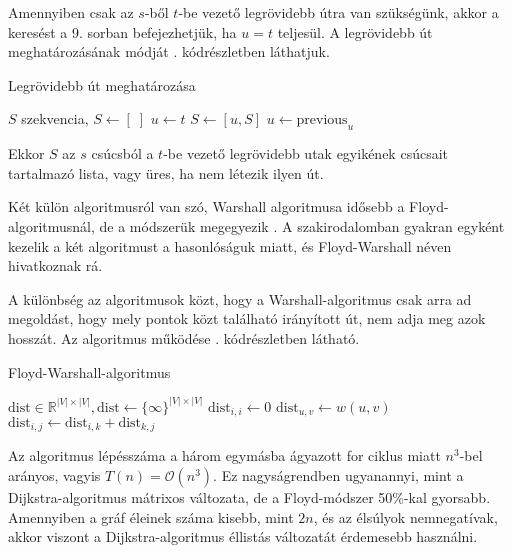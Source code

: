 Amennyiben csak az $s$-ből $t$-be vezető legrövidebb útra van szükségünk, akkor a keresést a 9. sorban befejezhetjük, ha $u = t$ teljesül. A legrövidebb út meghatározásának módját . kódrészletben láthatjuk.

\begin{algorithm}
\caption{Legrövidebb út meghatározása}
\begin{algorithmic}[1]
\STATE $S$ szekvencia, $S \gets [\;]$
\STATE $u \gets t$
    \STATE $S \gets [u, S]$
    \STATE $u \gets \text{previous}_u$
\ENDWHILE
\end{algorithmic}
\label{algo:legrovidebb}
\end{algorithm}

Ekkor $S$ az $s$ csúcsból a $t$-be vezető legrövidebb utak egyikének csúcsait tartalmazó lista, vagy üres, ha nem létezik ilyen út.

\newpage


Két külön algoritmusról van szó, Warshall algoritmusa idősebb a Floyd-algoritmusnál, de a módszerük megegyezik \cite{floyd-warshall}. A szakirodalomban gyakran egyként kezelik a két algoritmust a hasonlóságuk miatt, és Floyd-Warshall néven hivatkoznak rá.

A különbség az algoritmusok közt, hogy a Warshall-algoritmus csak arra ad megoldást, hogy mely pontok közt található irányított út, nem adja meg azok hosszát. Az algoritmus működése . kódrészletben látható.

\begin{algorithm}
\caption{Floyd-Warshall-algoritmus}
\begin{algorithmic}[1]
\STATE $\text{dist} \in \mathbb{R}^{|V| \times |V|}, \text{dist} \gets \{\infty\}^{|V| \times |V|}$
    \STATE $\text{dist}_{i, i} \gets 0$
\ENDFOR
{}
    \STATE $\text{dist}_{u, v} \gets w(u, v)$
\ENDFOR
{}
                \STATE $\text{dist}_{i, j} \gets \text{dist}_{i, k} + \text{dist}_{k, j}$
            \ENDIF
        \ENDFOR
    \ENDFOR
\ENDFOR
\end{algorithmic}
\label{algo:floyd-warshall}
\end{algorithm}

Az algoritmus lépésszáma a három egymásba ágyazott for ciklus miatt $n^3$-bel arányos, vagyis $T(n) = \mathcal{O}(n^3)$. Ez nagyságrendben ugyanannyi, mint a Dijkstra-algoritmus mátrixos változata, de a Floyd-módszer 50\%-kal gyorsabb. Amennyiben a gráf éleinek száma kisebb, mint $2n$, és az élsúlyok nemnegatívak, akkor viszont a Dijkstra-algoritmus éllistás változatát érdemesebb használni.

